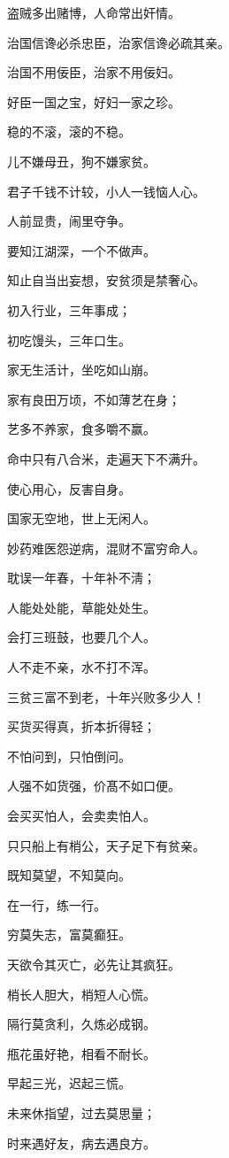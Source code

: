 \documentclass[12pt,oneside]{book}
\begin{document}
盗贼多出赌博，人命常出奸情。

治国信谗必杀忠臣，治家信谗必疏其亲。

治国不用佞臣，治家不用佞妇。

好臣一国之宝，好妇一家之珍。

稳的不滚，滚的不稳。

儿不嫌母丑，狗不嫌家贫。

君子千钱不计较，小人一钱恼人心。

人前显贵，闹里夺争。

要知江湖深，一个不做声。

知止自当出妄想，安贫须是禁奢心。

初入行业，三年事成；

初吃馒头，三年口生。

家无生活计，坐吃如山崩。

家有良田万顷，不如薄艺在身；

艺多不养家，食多嚼不赢。

命中只有八合米，走遍天下不满升。

使心用心，反害自身。

国家无空地，世上无闲人。

妙药难医怨逆病，混财不富穷命人。

耽误一年春，十年补不淸；

人能处处能，草能处处生。

会打三班鼓，也要几个人。

人不走不亲，水不打不浑。

三贫三富不到老，十年兴败多少人！

买货买得真，折本折得轻；

不怕问到，只怕倒问。

人强不如货强，价髙不如口便。

会买买怕人，会卖卖怕人。

只只船上有梢公，天子足下有贫亲。

既知莫望，不知莫向。

在一行，练一行。

穷莫失志，富莫癫狂。

天欲令其灭亡，必先让其疯狂。

梢长人胆大，梢短人心慌。

隔行莫贪利，久炼必成钢。

甁花虽好艳，相看不耐长。

早起三光，迟起三慌。

未来休指望，过去莫思量；

时来遇好友，病去遇良方。
\end{document}
